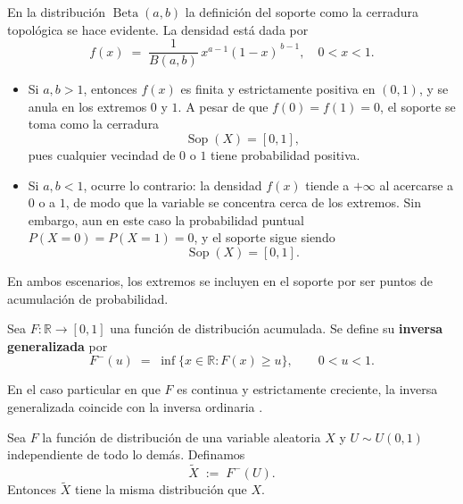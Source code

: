 \documentclass[../Main.tex]{subfiles}
\begin{document}
\begin{remark}{}{}
En la distribución $\operatorname{Beta}(a,b)$ la definición del soporte como la cerradura topológica se hace evidente.  
La densidad está dada por
\[
   f(x) \;=\; \frac{1}{B(a,b)} \, x^{a-1} (1-x)^{\,b-1}, \quad 0 < x < 1.
\]

\begin{itemize}
   \item Si $a,b>1$, entonces $f(x)$ es finita y estrictamente positiva en $(0,1)$, y se anula en los extremos $0$ y $1$.  
   A pesar de que $f(0)=f(1)=0$, el soporte se toma como la cerradura
   \[
      \operatorname{Sop}(X) = [0,1],
   \]
   pues cualquier vecindad de $0$ o $1$ tiene probabilidad positiva.

   \item Si $a,b<1$, ocurre lo contrario: la densidad $f(x)$ tiende a $+\infty$ al acercarse a $0$ o a $1$, de modo que la variable se concentra cerca de los extremos.  
   Sin embargo, aun en este caso la probabilidad puntual $P(X=0)=P(X=1)=0$, y el soporte sigue siendo
   \[
      \operatorname{Sop}(X) = [0,1].
   \]
\end{itemize}

En ambos escenarios, los extremos se incluyen en el soporte por ser puntos de acumulación de probabilidad.
\end{remark}

\begin{definition}{}{}
Sea $F:\mathbb R\to[0,1]$ una función de distribución acumulada.
Se define su \textbf{inversa generalizada} por
\[
    F^{-}(u)\;=\;
    \inf\bigl\{x\in\mathbb R : F(x)\ge u\bigr\},
    \qquad 0<u<1.
\]
\end{definition}

\begin{remark}{}{}
En el caso particular en que $F$ es continua y estrictamente creciente,
la inversa generalizada coincide con la inversa ordinaria \cite{BaltazarLarios2024}.
\end{remark}

\begin{lemma}{}{}
Sea $F$ la función de distribución de una variable aleatoria $X$ y
$U\sim U(0,1)$ independiente de todo lo demás.
Definamos
\[
    \tilde X \;:=\; F^{-}(U).
\]
Entonces $\tilde X$ tiene la misma distribución que $X$.
\end{lemma}
\end{document}

